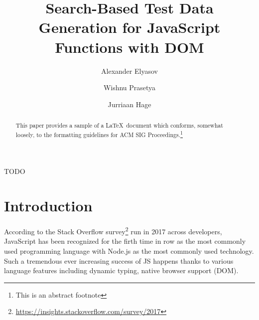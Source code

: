 \documentclass[sigconf]{acmart}
\begin{document}
\title{Search-Based Test Data Generation for JavaScript Functions with DOM}



\author{Alexander Elyasov}

\author{Wishnu Prasetya}

\author{Jurriaan Hage}


\begin{abstract}
This paper provides a sample of a \LaTeX\ document which conforms,
somewhat loosely, to the formatting guidelines for
ACM SIG Proceedings.\footnote{This is an abstract footnote}
\end{abstract}

%
%
\begin{CCSXML}
TODO 
\end{CCSXML}





\maketitle


\section{Introduction}
\label{sec.intro}

According to the Stack Overflow survey\footnote{\url{https://insights.stackoverflow.com/survey/2017}} run in 2017 across developers, JavaScript has been recognized for the firth time in row as the most commonly used programming language with Node.js as the most commonly used technology. Such a tremendous ever increasing success of JS happens thanks to various language features including dynamic typing, native browser support (DOM).  
\end{document}
